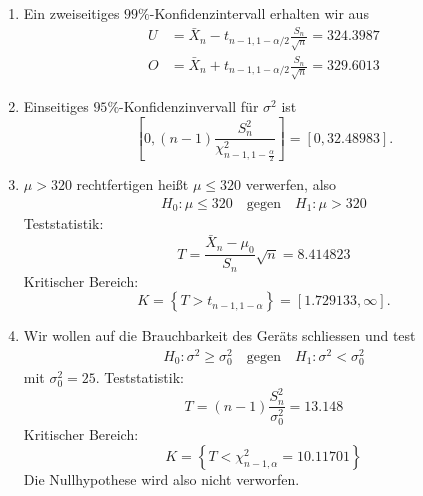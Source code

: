 \solution
\begin{enumerate}
    \item Ein zweiseitiges $99\%$-Konfidenzintervall erhalten wir aus
        \begin{align*}
            U &= \bar X_n - t_{n-1, 1-\alpha/2}\frac{S_n}{\sqrt{n}} = 324.3987 \\
            O &= \bar X_n + t_{n-1, 1-\alpha/2}\frac{S_n}{\sqrt{n}} = 329.6013
        \end{align*}

    \item Einseitiges $95\%$-Konfidenzinvervall für $\sigma^2$ ist 
        \begin{equation*}
            \left[ 0, (n-1)\frac{S^2_n}{ \chi^{2}_{n-1, 1 - \frac{\alpha}{2}} } \right] = \left[ 0, 32.48983 \right].
        \end{equation*}

    \item $\mu>320$ rechtfertigen heißt $\mu\leq 320$ verwerfen, also
        \begin{align*}
            H_0: \mu \leq 320 \quad\text{gegen}\quad H_1 : \mu > 320
        \end{align*}
        Teststatistik:
        \begin{equation*}
            T = \frac{\bar X_n - \mu_0}{S_n} \sqrt{n} = 8.414823
        \end{equation*}
        Kritischer Bereich:
        \begin{equation*}
            K = \left\{ T > t_{n-1, 1-\alpha} \right\} = [ 1.729133, \infty].
        \end{equation*}

    \item Wir wollen auf die Brauchbarkeit des Geräts schliessen und test
        \begin{align*}
            H_0 : \sigma^2 \geq \sigma^{2}_{0} \quad\text{gegen}\quad H_1 : \sigma^2 < \sigma^2_0
        \end{align*}
        mit $\sigma^{2}_{0} = 25$. Teststatistik:
        \begin{equation*}
            T = (n-1)\frac{S^{2}_{n}}{\sigma^{2}_{0}} = 13.148
        \end{equation*}
        Kritischer Bereich:
        \begin{equation*}
            K = \left\{ T < \chi^{2}_{n-1, \alpha} = 10.11701 \right\}
        \end{equation*}
        Die Nullhypothese wird also nicht verworfen. 
\end{enumerate}



